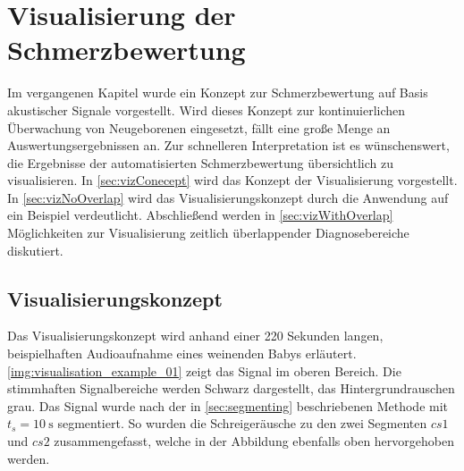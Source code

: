 \chapter{Visualisierung der Schmerzbewertung}
\label{sec:visualisation}

Im vergangenen Kapitel wurde ein Konzept zur Schmerzbewertung auf Basis akustischer Signale vorgestellt. Wird dieses Konzept zur kontinuierlichen Überwachung von Neugeborenen eingesetzt, fällt eine große Menge an Auswertungsergebnissen an. Zur schnelleren Interpretation ist es wünschenswert, die Ergebnisse der automatisierten Schmerzbewertung übersichtlich zu visualisieren. In \autoref{sec:vizConecept} wird das Konzept der Visualisierung vorgestellt. In \autoref{sec:vizNoOverlap} wird das Visualisierungskonzept durch die Anwendung auf ein Beispiel verdeutlicht. Abschließend werden in \autoref{sec:vizWithOverlap} Möglichkeiten zur Visualisierung zeitlich überlappender Diagnosebereiche diskutiert.

\section{Visualisierungskonzept}
\label{sec:vizConecept}

Das Visualisierungskonzept wird anhand einer 220 Sekunden langen, beispielhaften Audioaufnahme eines weinenden Babys erläutert. \autoref{img:visualisation_example_01} zeigt das Signal im oberen Bereich. Die stimmhaften Signalbereiche werden Schwarz dargestellt, das Hintergrundrauschen grau. Das Signal wurde nach der in \autoref{sec:segmenting} beschriebenen Methode mit $t_{s} = \SI{10}{\second}$ segmentiert. So wurden die Schreigeräusche zu den zwei Segmenten $cs1$ und $cs2$ zusammengefasst, welche in der Abbildung ebenfalls oben hervorgehoben werden.


